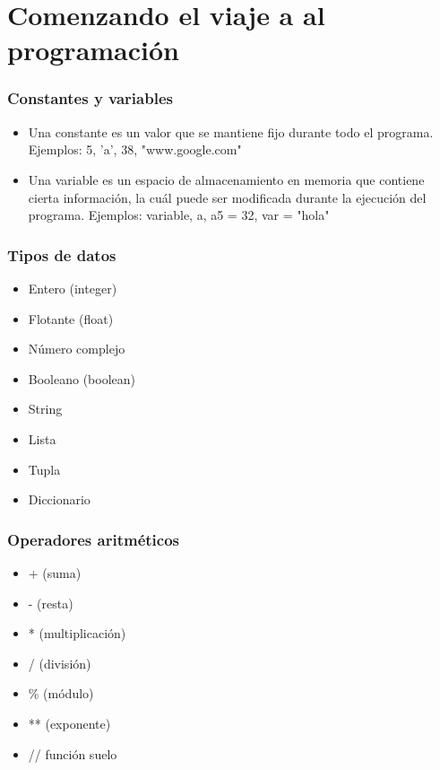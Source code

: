 \documentclass[hyperref={pdfpagelabels=false},xcolor=pst,pdf,fragile]{beamer}
\author{
  Luis, Gutierrez
  \texttt{cinema.nightmare@gmail.com}
  \and
  \\Carlos Rodríguez
  \texttt{carlosrdz.isd@gmail.com}
}
\title{\Title}
\date{\today}
\begin{document}
\maketitle



\section{Comenzando el viaje a al programación}
\begin{frame}
    \frametitle{Constantes y variables}
    \pause
    \begin{itemize}
    \item Una constante es un valor que se mantiene fijo durante todo el programa. 
    Ejemplos: 5, 'a', 38, "www.google.com"
    \item Una variable es un espacio de almacenamiento en memoria que contiene cierta información, la cuál puede ser modificada durante la ejecución del programa.
    Ejemplos: variable, a, a5 = 32, var = "hola"
    \end{itemize}
\end{frame}

\begin{frame}
    \frametitle{Tipos de datos}
    \pause
    \begin{itemize}
    \item Entero (integer)
    \item Flotante (float)
    \item Número complejo
    \item Booleano (boolean)
    \item String
    \item Lista
    \item Tupla
    \item Diccionario
    \end{itemize}
\end{frame}

\begin{frame}
    \frametitle{Operadores aritméticos}
    \pause
    \begin{itemize}
    \item + (suma)
    \item - (resta)
    \item * (multiplicación)
    \item / (división)
    \item \% (módulo)
    \item ** (exponente)
    \item // función suelo
    \end{itemize}
\end{frame}
\end{document}
